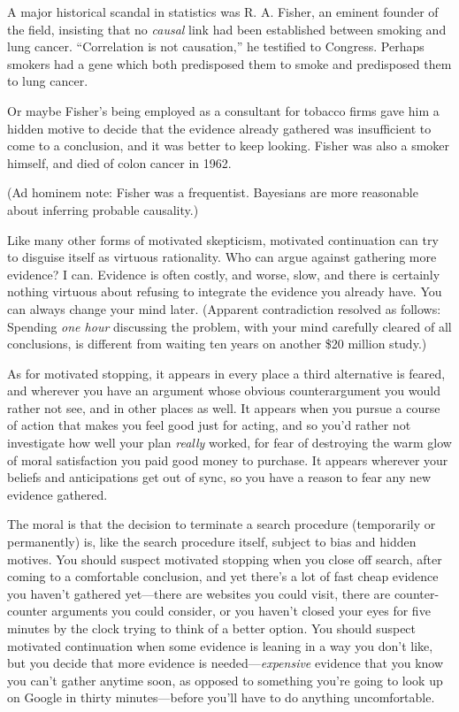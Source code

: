 {
 A major historical scandal in statistics was R. A. Fisher, an
eminent founder of the field, insisting that no \textit{causal} link
had been established between smoking and lung cancer.
``Correlation is not causation,'' he
testified to Congress. Perhaps smokers had a gene which both
predisposed them to smoke and predisposed them to lung cancer.}

{
 Or maybe Fisher's being employed as a consultant
for tobacco firms gave him a hidden motive to decide that the evidence
already gathered was insufficient to come to a conclusion, and it was
better to keep looking. Fisher was also a smoker himself, and died of
colon cancer in 1962.}

{
 (Ad hominem note: Fisher was a frequentist. Bayesians are more
reasonable about inferring probable causality.)}

{
 Like many other forms of motivated skepticism, motivated
continuation can try to disguise itself as virtuous rationality. Who
can argue against gathering more evidence? I can. Evidence is often
costly, and worse, slow, and there is certainly nothing virtuous about
refusing to integrate the evidence you already have. You can always
change your mind later. (Apparent contradiction resolved as follows:
Spending \textit{one hour} discussing the problem, with your mind
carefully cleared of all conclusions, is different from waiting ten
years on another \$20 million study.)}

{
 As for motivated stopping, it appears in every place a third
alternative is feared, and wherever you have an argument whose obvious
counterargument you would rather not see, and in other places as well.
It appears when you pursue a course of action that makes you feel good
just for acting, and so you'd rather not investigate
how well your plan \textit{really} worked, for fear of destroying the
warm glow of moral satisfaction you paid good money to purchase. It
appears wherever your beliefs and anticipations get out of sync, so you
have a reason to fear any new evidence gathered.}

{
 The moral is that the decision to terminate a search procedure
(temporarily or permanently) is, like the search procedure itself,
subject to bias and hidden motives. You should suspect motivated
stopping when you close off search, after coming to a comfortable
conclusion, and yet there's a lot of fast cheap
evidence you haven't gathered yet---there are websites
you could visit, there are counter-counter arguments you could
consider, or you haven't closed your eyes for five
minutes by the clock trying to think of a better option. You should
suspect motivated continuation when some evidence is leaning in a way
you don't like, but you decide that more evidence is
needed---\textit{expensive} evidence that you know you
can't gather anytime soon, as opposed to something
you're going to look up on Google in thirty
minutes---before you'll have to do anything
uncomfortable.}

